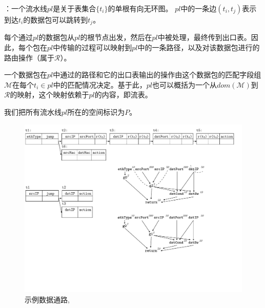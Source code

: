 ：一个流水线$pl$是关于表集合$\{t_i\}$的单根有向无环图。 $pl$中的一条边$(t_i, t_j)$表示到达$t_i$的数据包可以跳转到$t_j$。


每个通过$pl$的数据包从$pl$的根节点出发，然后在$pl$中被处理，最终传到出口表。因此，每个包在$pl$中传输的过程可以映射到$pl$中的一条路径，以及对该数据包进行的路由操作（属于$\mathcal{R}$）。

一个数据包在$pl$中通过的路径和它的出口表输出的操作由这个数据包的匹配字段组$\mathcal{M}$在每个$t_i \in pl$中的匹配情况决定。基于此，$pl$也可以概括为一个从$dom(\mathcal{M})$到$\mathcal{R}$的映射，这个映射依赖于$pl$的内容，即流表。

我们把所有流水线$pl$所在的空间标识为$P$。





\begin{figure}[tbh]
    \centering
    \vspace{-1mm}
    \includegraphics[scale = 0.6]{figures/figure3.pdf}
    \vspace{-2mm}
    \caption{示例数据通路, \exampledp}
    \label{cap:fig:swPipeline}
    \vspace{-2mm}
\end{figure}

